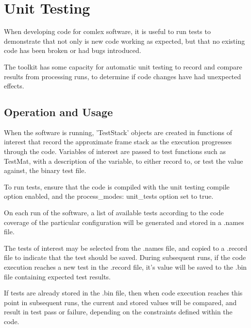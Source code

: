\chapter{Unit Testing} \label{ch:UnitTesting}

When developing code for comlex software, it is useful to run tests to demonstrate that not only is new code working as expected, but that no existing code has been broken or had bugs introduced.

The toolkit has some capacity for automatic unit testing to record and compare results from processing runs, to determine if code changes have had unexpected effects.


\section{Operation and Usage} 

When the software is running, 'TestStack' objects are created in functions of interest that record the approximate frame stack as the execution progresses through the code. 
Variables of interest are passed to test functions such as TestMat, with a description of the variable, to either record to, or test the value against, the binary test file.

To run tests, ensure that the code is compiled with the unit testing compile option enabled, and the process\_modes: unit\_tests option set to true.

On each run of the software, a list of available tests according to the code coverage of the particular configuration will be generated and stored in a .names file.

The tests of interest may be selected from the .names file, and copied to a .record file to indicate that the test should be saved.
During subsequent runs, if the code execution reaches a new test in the .record file, it's value will be saved to the .bin file containing expected test results.

If tests are already stored in the .bin file, then when code execution reaches this point in subsequent runs, the current and stored values will be compared, and result in test pass or failure, depending on the constraints defined within the code.

